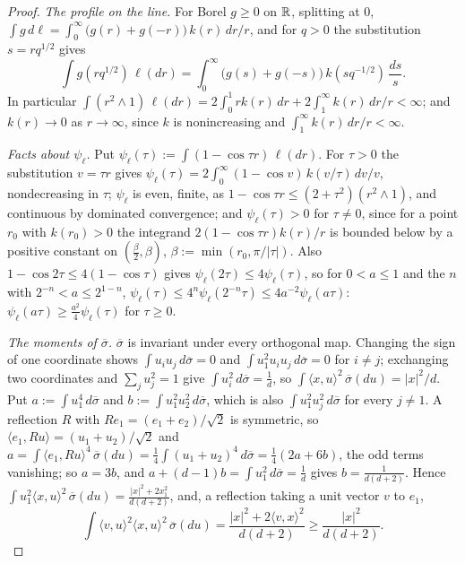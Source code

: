 \begin{proof}
\leanok
\emph{The profile on the line.} For Borel $g \ge 0$ on $\mathbb{R}$, splitting at $0$,
$\int g\,d\ell = \int_0^\infty\bigl(g(r) + g(-r)\bigr)\,k(r)\,dr/r$, and for $q > 0$ the substitution $s = rq^{1/2}$ gives
\[
  \int g(rq^{1/2})\,\ell(dr) = \int_0^\infty\bigl(g(s) + g(-s)\bigr)\,k(sq^{-1/2})\,\frac{ds}{s} .
\]
In particular $\int(r^2 \wedge 1)\,\ell(dr) = 2\int_0^1rk(r)\,dr + 2\int_1^\infty k(r)\,dr/r < \infty$; and $k(r) \to 0$ as
$r \to \infty$, since $k$ is nonincreasing and $\int_1^\infty k(r)\,dr/r < \infty$.

\emph{Facts about $\psi_\ell$.} Put $\psi_\ell(\tau) := \int(1 - \cos\tau r)\,\ell(dr)$. For $\tau > 0$ the substitution $v = \tau r$ gives
$\psi_\ell(\tau) = 2\int_0^\infty(1 - \cos v)\,k(v/\tau)\,dv/v$, nondecreasing in $\tau$; $\psi_\ell$ is even, finite, as
$1 - \cos\tau r \le (2 + \tau^2)(r^2 \wedge 1)$, and continuous by dominated convergence; and $\psi_\ell(\tau) > 0$ for
$\tau \ne 0$, since for a point $r_0$ with $k(r_0) > 0$ the integrand $2(1 - \cos\tau r)k(r)/r$ is bounded below by a
positive constant on $(\tfrac\beta2,\beta)$, $\beta := \min(r_0, \pi/|\tau|)$. Also $1 - \cos 2\tau \le 4(1 - \cos\tau)$ gives
$\psi_\ell(2\tau) \le 4\psi_\ell(\tau)$, so for $0 < a \le 1$ and the $n$ with $2^{-n} < a \le 2^{1-n}$,
$\psi_\ell(\tau) \le 4^n\psi_\ell(2^{-n}\tau) \le 4a^{-2}\psi_\ell(a\tau)$: $\psi_\ell(a\tau) \ge \tfrac{a^2}4\psi_\ell(\tau)$ for $\tau \ge 0$.

\emph{The moments of $\overline\sigma$.} $\overline\sigma$ is invariant under every orthogonal map. Changing the sign of
one coordinate shows $\int u_iu_j\,d\overline\sigma = 0$ and $\int u_1^2u_iu_j\,d\overline\sigma = 0$ for $i \ne j$; exchanging
two coordinates and $\sum_ju_j^2 = 1$ give $\int u_i^2\,d\overline\sigma = \tfrac1d$, so
$\int\langle x,u\rangle^2\,\overline\sigma(du) = |x|^2/d$. Put $a := \int u_1^4\,d\overline\sigma$ and $b := \int u_1^2u_2^2\,d\overline\sigma$, which
is also $\int u_1^2u_j^2\,d\overline\sigma$ for every $j \ne 1$. A reflection $R$ with $Re_1 = (e_1 + e_2)/\sqrt2$ is
symmetric, so $\langle e_1,Ru\rangle = (u_1 + u_2)/\sqrt2$ and
$a = \int\langle e_1,Ru\rangle^4\,\overline\sigma(du) = \tfrac14\int(u_1 + u_2)^4\,d\overline\sigma = \tfrac14(2a + 6b)$, the odd terms
vanishing; so $a = 3b$, and $a + (d-1)b = \int u_1^2\,d\overline\sigma = \tfrac1d$ gives $b = \frac1{d(d+2)}$. Hence
$\int u_1^2\langle x,u\rangle^2\,\overline\sigma(du) = \frac{|x|^2 + 2x_1^2}{d(d+2)}$, and, a reflection taking a unit vector $v$
to $e_1$,
\[
  \int\langle v,u\rangle^2\langle x,u\rangle^2\,\overline\sigma(du) = \frac{|x|^2 + 2\langle v,x\rangle^2}{d(d+2)} \ge \frac{|x|^2}{d(d+2)} .
\]


\end{proof}
